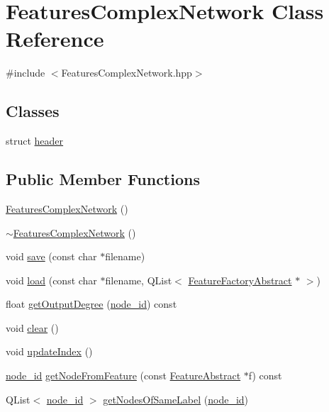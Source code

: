 \hypertarget{class_features_complex_network}{\section{Features\+Complex\+Network Class Reference}
\label{class_features_complex_network}
}


{\ttfamily \#include $<$Features\+Complex\+Network.\+hpp$>$}

\subsection*{Classes}
\begin{DoxyCompactItemize}
\item 
struct \hyperlink{struct_features_complex_network_1_1header}{header}
\end{DoxyCompactItemize}
\subsection*{Public Member Functions}
\begin{DoxyCompactItemize}
\item 
\hyperlink{class_features_complex_network_ad251cdf2e827d41e10c7b3fb1b2d8a22}{Features\+Complex\+Network} ()
\item 
\hyperlink{class_features_complex_network_a784109c6f62a250154d4b9add25b6409}{$\sim$\+Features\+Complex\+Network} ()
\item 
void \hyperlink{class_features_complex_network_a59981f76044a2b98eda4e69a20844ba0}{save} (const char $\ast$filename)
\item 
void \hyperlink{class_features_complex_network_a3f1fcc25a95cde233fecef194033497f}{load} (const char $\ast$filename, Q\+List$<$ \hyperlink{class_feature_factory_abstract}{Feature\+Factory\+Abstract} $\ast$ $>$)
\item 
float \hyperlink{class_features_complex_network_af275d9272ee96f6aee40af802c2c119f}{get\+Output\+Degree} (\hyperlink{_complex_network_8hpp_a8323334ca788fde39682469321590d52}{node\+\_\+id}) const 
\item 
void \hyperlink{class_features_complex_network_a747eba83de2a19a39e3d9f230d055d59}{clear} ()
\item 
void \hyperlink{class_features_complex_network_a8e1b87e9664a72c2062aae67bad94261}{update\+Index} ()
\item 
\hyperlink{_complex_network_8hpp_a8323334ca788fde39682469321590d52}{node\+\_\+id} \hyperlink{class_features_complex_network_a064dc6f506b11a04f3174810da085d60}{get\+Node\+From\+Feature} (const \hyperlink{class_feature_abstract}{Feature\+Abstract} $\ast$f) const 
\item 
Q\+List$<$ \hyperlink{_complex_network_8hpp_a8323334ca788fde39682469321590d52}{node\+\_\+id} $>$ \hyperlink{class_features_complex_network_a06275636cdb560a44d9cc4d82b47ce53}{get\+Nodes\+Of\+Same\+Label} (\hyperlink{_complex_network_8hpp_a8323334ca788fde39682469321590d52}{node\+\_\+id})
\end{DoxyCompactItemize}
